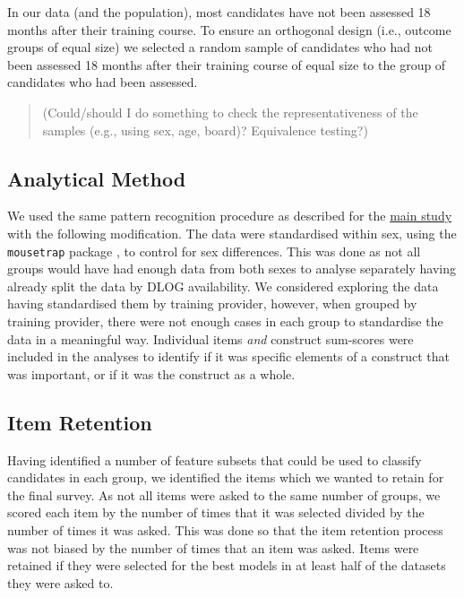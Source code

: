 \documentclass[
  12pt,
  a4paper,
]{book}
\begin{document}
In our data (and the population), most candidates have not been assessed 18 months after their training course. To ensure an orthogonal design (i.e., outcome groups of equal size) we selected a random sample of candidates who had not been assessed 18 months after their training course of equal size to the group of candidates who had been assessed.

\begin{quote}
(Could/should I do something to check the representativeness of the samples (e.g., using sex, age, board)? Equivalence testing?)
\end{quote}

\hypertarget{analytical-method}{%
\subsection{Analytical Method}\label{analytical-method}}

We used the same pattern recognition procedure as described for the \protect\hyperlink{pra-analytical-method}{main study} with the following modification. The data were standardised within sex, using the \texttt{mousetrap} package \citep{R-mousetrap}, to control for sex differences. This was done as not all groups would have had enough data from both sexes to analyse separately having already split the data by DLOG availability. We considered exploring the data having standardised them by training provider, however, when grouped by training provider, there were not enough cases in each group to standardise the data in a meaningful way. Individual items \emph{and} construct sum-scores were included in the analyses to identify if it was specific elements of a construct that was important, or if it was the construct as a whole.

\hypertarget{item-retention}{%
\subsection{Item Retention}\label{item-retention}}

Having identified a number of feature subsets that could be used to classify candidates in each group, we identified the items which we wanted to retain for the final survey. As not all items were asked to the same number of groups, we scored each item by the number of times that it was selected divided by the number of times it was asked. This was done so that the item retention process was not biased by the number of times that an item was asked. Items were retained if they were selected for the best models in at least half of the datasets they were asked to.
\end{document}
